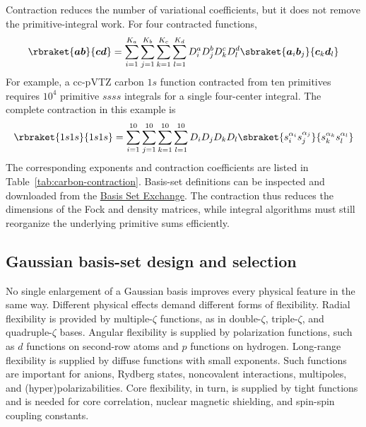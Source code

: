 Contraction reduces the number of variational coefficients, but it does not
remove the primitive-integral work. For four contracted functions,
\begin{equation}
  \rbraket{\ba\bb}{\bc\bd}
  =\sum_{i=1}^{K_a}\sum_{j=1}^{K_b}\sum_{k=1}^{K_c}\sum_{l=1}^{K_d}
  D_i^aD_j^bD_k^cD_l^d
  \sbraket{\ba_i\bb_j}{\bc_k\bd_l}
\end{equation}
For example, a cc-pVTZ carbon $1s$ function contracted from ten primitives
requires $10^4$ primitive $ssss$ integrals for a single four-center integral.
The complete contraction in this example is
\begin{equation}
 \rbraket{1s1s}{1s1s}
 =\sum_{i=1}^{10}\sum_{j=1}^{10}\sum_{k=1}^{10}\sum_{l=1}^{10}
 D_iD_jD_kD_l
 \sbraket{s_i^{\alpha_i}s_j^{\alpha_j}}{s_k^{\alpha_k}s_l^{\alpha_l}}
\end{equation}
The corresponding exponents and contraction coefficients are listed in
Table~\ref{tab:carbon-contraction}.
Basis-set definitions can be inspected and downloaded from the
\href{https://www.basissetexchange.org}{Basis Set Exchange}.
The contraction thus reduces the dimensions of the Fock and density
matrices, while integral algorithms must still reorganize the underlying
primitive sums efficiently.

\begin{table}[htbp]
  \centering
  \hftablestyle
  \caption{Primitive exponents and coefficients of one ten-primitive $s$
  contraction for carbon in cc-pVTZ. The shell scale is $1.00$. Values are
  extracted from the Basis Set Exchange; the basis family is due to Dunning
  \citep{Dunning1989,Pritchard2019}.}
  \label{tab:carbon-contraction}
  
\end{table}


\subsection{Gaussian basis-set design and selection}

No single enlargement of a Gaussian basis improves every physical feature in
the same way. Different physical effects demand different forms of
flexibility.
Radial flexibility is provided by multiple-$\zeta$ functions, as in
double-$\zeta$, triple-$\zeta$, and quadruple-$\zeta$ bases.
Angular flexibility is supplied by polarization functions, such as
$d$ functions on second-row atoms and $p$ functions on hydrogen.
Long-range flexibility is supplied by diffuse functions with small
exponents. Such functions are important for anions, Rydberg states,
noncovalent interactions, multipoles, and (hyper)polarizabilities.
Core flexibility, in turn, is supplied by tight functions and is
needed for core correlation, nuclear magnetic shielding, and spin-spin
coupling constants.

